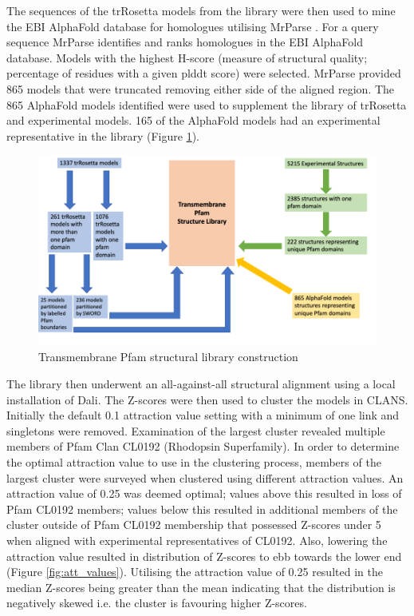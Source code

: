 The sequences of the trRosetta models from the library were then used to mine the EBI AlphaFold database for homologues utilising MrParse \cite{simpkin2021exploiting}. 
For a query sequence MrParse identifies and ranks homologues in the EBI AlphaFold database.  Models with the highest H-score (measure of structural quality; percentage of residues with a given plddt score) were selected.  MrParse provided 865 models that were truncated removing either side of the aligned region.  The 865 AlphaFold models identified were used to supplement the library of trRosetta and experimental models. 165 of the AlphaFold models had an experimental representative in the library (Figure \ref{fig:flow2}). 

\begin{figure}[th!]
    \centering
    \includegraphics[width=150mm, scale=0.75]{Pfam/flow2.png}
    \caption{Transmembrane Pfam structural library construction}
    \label{fig:flow2}
    \small
\end{figure}



The library then underwent an all-against-all structural alignment using a local installation of Dali.  The Z-scores were then used to cluster the models in CLANS. Initially the default 0.1 attraction value setting with a minimum of one link and singletons were removed. Examination of the largest cluster revealed multiple members of Pfam Clan CL0192 (Rhodopsin Superfamily). In order to determine the optimal attraction value to use in the clustering process, members of the largest cluster were surveyed when clustered using different attraction values. An attraction value of 0.25 was deemed optimal; values above this resulted in loss of Pfam CL0192 members; values below this resulted in additional members of the cluster outside of Pfam CL0192 membership that possessed Z-scores under 5 when aligned with experimental representatives of CL0192.  Also, lowering the attraction value resulted in distribution of Z-scores to ebb towards the lower end (Figure \ref{fig:att_values}).  Utilising the attraction value of 0.25 resulted in the median Z-scores being greater than the mean indicating that the distribution is negatively skewed i.e. the cluster is favouring higher Z-scores.

